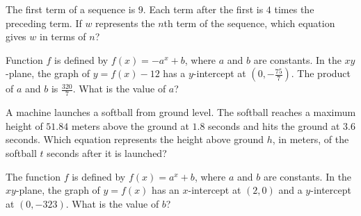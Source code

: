 \vspace{2em}

\noindent\markforreview
\vspace{1em}

The first term of a sequence is $9$. Each term after the first is $4$ times the preceding term.  
If $w$ represents the $n$th term of the sequence, which equation gives $w$ in terms of $n$?

\vspace{0.75em}


\vspace{2em}
\newpage
\noindent\markforreview
\vspace{1em}

Function $f$ is defined by $f(x) = -a^x + b$, where $a$ and $b$ are constants.  
In the $xy$-plane, the graph of $y = f(x) - 12$ has a $y$-intercept at $(0, -\frac{75}{7})$.  
The product of $a$ and $b$ is $\frac{320}{7}$. What is the value of $a$?

\vspace{2em}

\noindent\markforreview
\vspace{1em}

A machine launches a softball from ground level.  
The softball reaches a maximum height of $51.84$ meters above the ground at $1.8$ seconds and hits the ground at $3.6$ seconds.  
Which equation represents the height above ground $h$, in meters, of the softball $t$ seconds after it is launched?

\vspace{0.75em}


\vspace{2em}

\noindent\markforreview
\vspace{1em}

The function $f$ is defined by $f(x) = a^x + b$, where $a$ and $b$ are constants.  
In the $xy$-plane, the graph of $y = f(x)$ has an $x$-intercept at $(2, 0)$ and a $y$-intercept at $(0, -323)$.  
What is the value of $b$?

\vspace{2em}
\newpage
\noindent\markforreview
\vspace{1em}

